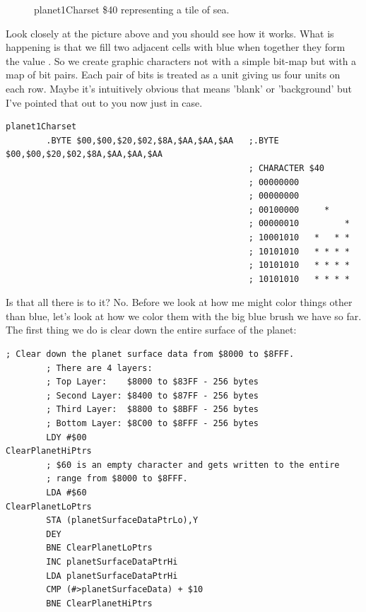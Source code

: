 \begin{figure}[H]
{\begin{adjustbox}{width=4cm,center}
\begin{tikzpicture}
      \end{tikzpicture}
    \end{adjustbox}
  }\caption{planet1Charset \$40 representing a tile of sea.}
\end{figure}

Look closely at the picture above and you should see how it works. What is happening is that we fill
two adjacent cells with blue when together they form the value . So
we create graphic characters not with a simple bit-map but with a map of bit pairs. Each pair of bits is treated as a
unit giving us four units on each row. Maybe it's intuitively obvious that 
means 'blank' or 'background' but I've pointed that out to you now just in case.

\lstset{style=6502Style}
\begin{lstlisting}[caption=Character \icode{\$40} representing the sea as it is defined in the source code. A full eight bytes are required
to define each character\, so not cheap.,basicstyle=\tiny]
planet1Charset
        .BYTE $00,$00,$20,$02,$8A,$AA,$AA,$AA   ;.BYTE $00,$00,$20,$02,$8A,$AA,$AA,$AA
                                                ; CHARACTER $40
                                                ; 00000000           
                                                ; 00000000           
                                                ; 00100000     *     
                                                ; 00000010         * 
                                                ; 10001010   *   * * 
                                                ; 10101010   * * * * 
                                                ; 10101010   * * * * 
                                                ; 10101010   * * * * 
\end{lstlisting}

Is that all there is to it? No. Before we look at how me might color things other than blue, let's look at how we color them
with the big blue brush we have so far. The first thing we do is clear down the entire surface of the planet:

\begin{lstlisting}[caption=The surface data is stored from \icode{\$8000} to \icode{\$8FFF}. This code overwrites it all with 
the value \$60\, which is an empty bitmap.]
        ; Clear down the planet surface data from $8000 to $8FFF.
        ; There are 4 layers:
        ; Top Layer:    $8000 to $83FF - 256 bytes 
        ; Second Layer: $8400 to $87FF - 256 bytes 
        ; Third Layer:  $8800 to $8BFF - 256 bytes 
        ; Bottom Layer: $8C00 to $8FFF - 256 bytes 
        LDY #$00
ClearPlanetHiPtrs   
        ; $60 is an empty character and gets written to the entire
        ; range from $8000 to $8FFF.
        LDA #$60
ClearPlanetLoPtrs   
        STA (planetSurfaceDataPtrLo),Y
        DEY
        BNE ClearPlanetLoPtrs
        INC planetSurfaceDataPtrHi
        LDA planetSurfaceDataPtrHi
        CMP (#>planetSurfaceData) + $10
        BNE ClearPlanetHiPtrs
\end{lstlisting}

